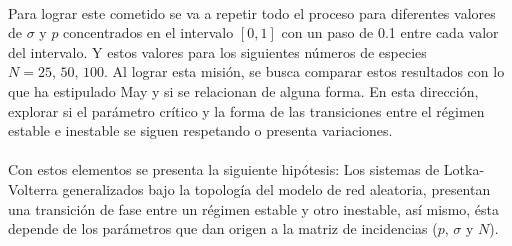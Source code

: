 \\
Para lograr este cometido se va a repetir todo el proceso para diferentes valores de $\sigma$ y $p$ concentrados en el intervalo $[0,1]$ con un paso de 0.1 entre cada valor del intervalo. Y estos valores para los siguientes números de especies $N=25,\,50,\, 100$. Al lograr esta misión, se busca comparar estos resultados con lo que ha estipulado May y si se relacionan de alguna forma. En esta dirección, explorar si el parámetro crítico y la forma de las transiciones entre el régimen estable e inestable se siguen respetando o presenta variaciones.\\
\\
Con estos elementos se presenta la siguiente hipótesis: Los sistemas de Lotka-Volterra generalizados bajo la topología del modelo de red aleatoria, presentan una transición de fase entre un régimen estable y otro inestable, así mismo, ésta depende de los parámetros que dan origen a la matriz de incidencias ($p$, $\sigma$ y $N$).

